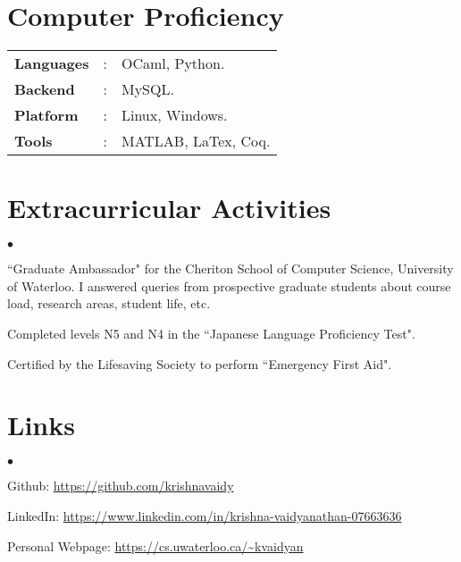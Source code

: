 \documentclass[margin,line]{res}
\newenvironment{list2}{
  \begin{list}{$\bullet$}{%
      \setlength{\itemsep}{0in}
      \setlength{\parsep}{0in} \setlength{\parskip}{0in}
      \setlength{\topsep}{0in} \setlength{\partopsep}{0in} 
      \setlength{\leftmargin}{0.2in}}}{\end{list}}
\begin{document}
\begin{resume}
\section{\sc Computer Proficiency}
\begin{tabular}{l l l}

\textbf{Languages}&: & OCaml, Python.\\
\textbf{Backend}&:	& MySQL.\\
\textbf{Platform}&:  & Linux, Windows.\\
\textbf{Tools}&:     &MATLAB, LaTex, Coq.\\
\end{tabular}

\section{\sc Extracurricular Activities}
\begin{list2}
\item ``Graduate Ambassador" for the Cheriton School of Computer Science,
    University of Waterloo. I answered queries from prospective graduate
    students about course load, research areas, student life, etc.
\item Completed levels N5 and N4 in the ``Japanese Language Proficiency Test".
\item Certified by the Lifesaving Society to perform ``Emergency First Aid".
\end{list2}

\section{\sc Links}
\begin{list2}
\item Github: \url{https://github.com/krishnavaidy}
\item LinkedIn: \url{https://www.linkedin.com/in/krishna-vaidyanathan-07663636}
\item Personal Webpage: \url{https://cs.uwaterloo.ca/~kvaidyan}
\end{list2}
\end{resume}
\end{document}
